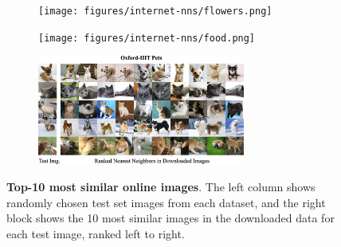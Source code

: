 \begin{figure}
    \centering
    
    \begin{subfigure}{\textwidth}
        \centering
        \texttt{[image: figures/internet-nns/flowers.png]}
    \end{subfigure}
    \vspace{0.1em}

    \begin{subfigure}{\textwidth}
        \centering
        \texttt{[image: figures/internet-nns/food.png]}
    \end{subfigure}
    \vspace{0.1em}

    \begin{subfigure}{\textwidth}
        \centering
        \includegraphics[width=0.75\textwidth]{figures/internet-nns/pets.png}
    \end{subfigure}
    \vspace{0.1em}
    
    \caption{
        \textbf{Top-10 most similar online images}.
        The left column shows randomly chosen test set images from each dataset, and the right block shows the 10 most similar images in the downloaded data for each test image,
        ranked left to right.
    }
    \label{fig:online_images}
\end{figure}

